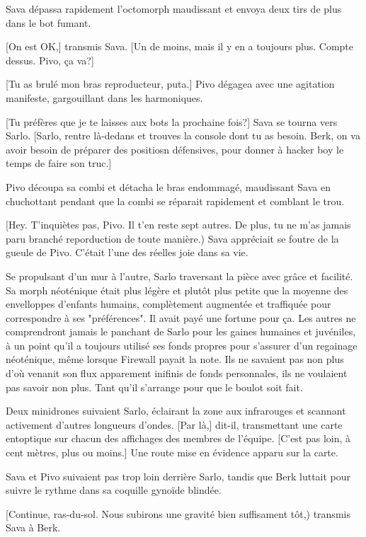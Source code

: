 Sava dépassa rapidement l'octomorph maudissant et envoya deux tirs de plus dans le bot fumant. 

[On est OK,] transmis Sava. [Un de moins, mais il y en a toujours plus. Compte dessus. Pivo, ça va?] 

[Tu as brulé mon bras reproducteur, puta.] Pivo dégagea avec une agitation manifeste, gargouillant dans les harmoniques. 

[Tu préfères que je te laisses aux bots la prochaine fois?] Sava se tourna vers Sarlo. [Sarlo, rentre là-dedans et trouves la console dont tu as besoin. Berk, on va avoir besoin de préparer des positiosn défensives, pour donner à hacker boy le temps de faire son truc.] 

Pivo découpa sa combi et détacha le bras endommagé, maudissant Sava en chuchottant pendant que la combi se réparait rapidement et comblant le trou. 

[Hey. T'inquiètes pas, Pivo. Il t'en reste sept autres. De plus, tu ne m'as jamais paru branché reporduction de toute manière.) Sava appréciait se foutre de la gueule de Pivo. C'était l'une des réelles joie dans sa vie. 

Se propulsant d'un mur à l'autre, Sarlo traversant la pièce avec grâce et facilité. Sa morph néoténique était plus légère et plutôt plus petite que la moyenne des envelloppes d'enfants humains, complètement augmentée et traffiquée pour correspondre à ses "préférences". Il avait payé une fortune pour ça. Les autres ne comprendront jamais le panchant de Sarlo pour les gaines humaines et juvéniles, à un point qu'il a toujours utilisé ses fonds propres pour s'assurer d'un regainage néoténique, même lorsque Firewall payait la note. Ils ne savaient pas non plus d'où venanit son flux apparement inifinis de fonds personnales, ils ne voulaient pas savoir non plus. Tant qu'il s'arrange pour que le boulot soit fait. 

Deux minidrones suivaient Sarlo, éclairant la zone aux infrarouges et scannant activement d'autres longueurs d'ondes. [Par là,] dit-il, transmettant une carte entoptique sur chacun des affichages des membres de l'équipe. [C'est pas loin, à cent mètres, plus ou moins.] Une route mise en évidence apparu sur la carte. 

Sava et Pivo suivaient pas trop loin derrière Sarlo, tandis que Berk luttait pour suivre le rythme dans sa coquille gynoïde blindée. 

[Continue, ras-du-sol. Nous subirons une gravité bien suffisament tôt,) transmis Sava à Berk. 

